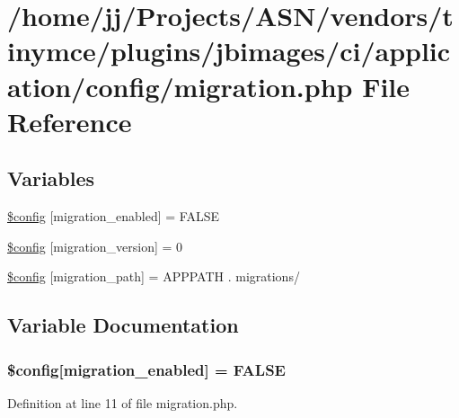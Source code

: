 \hypertarget{migration_8php}{}\section{/home/jj/\+Projects/\+A\+S\+N/vendors/tinymce/plugins/jbimages/ci/application/config/migration.php File Reference}
\label{migration_8php}
\subsection*{Variables}
\begin{DoxyCompactItemize}
\item 
\hyperlink{migration_8php_ad6392796c28d7391c3977c2cceef3cc2}{\$config} \mbox{[}\textquotesingle{}migration\+\_\+enabled\textquotesingle{}\mbox{]} = F\+A\+L\+SE
\item 
\hyperlink{migration_8php_a53ca48939aaf8c92f0c0d239a294fff2}{\$config} \mbox{[}\textquotesingle{}migration\+\_\+version\textquotesingle{}\mbox{]} = 0
\item 
\hyperlink{migration_8php_abc04383313304e348060a7ee39f5a8ee}{\$config} \mbox{[}\textquotesingle{}migration\+\_\+path\textquotesingle{}\mbox{]} = A\+P\+P\+P\+A\+TH . \textquotesingle{}migrations/\textquotesingle{}
\end{DoxyCompactItemize}


\subsection{Variable Documentation}
\subsubsection[{\texorpdfstring{\$config}{$config}}]{\setlength{\rightskip}{0pt plus 5cm}\$config\mbox{[}\textquotesingle{}migration\+\_\+enabled\textquotesingle{}\mbox{]} = F\+A\+L\+SE}\hypertarget{migration_8php_ad6392796c28d7391c3977c2cceef3cc2}{}\label{migration_8php_ad6392796c28d7391c3977c2cceef3cc2}


Definition at line 11 of file migration.\+php.


